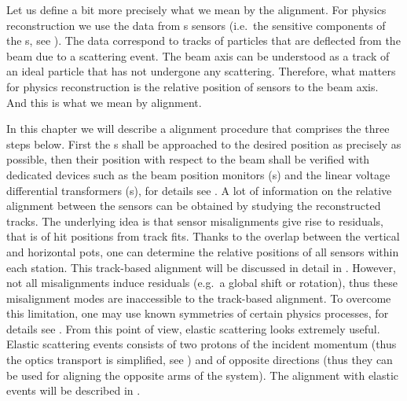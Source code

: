 Let us define a bit more precisely what we mean by the  alignment. For physics reconstruction we use the data from s sensors (i.e.~the sensitive components of the s, see ). The data correspond to tracks of particles that are deflected from the beam due to a scattering event. The beam axis can be understood as a track of an ideal particle that has not undergone any scattering. Therefore, what matters for physics reconstruction is the relative position of  sensors to the beam axis. And this is what we mean by  alignment.


In this chapter we will describe a  alignment procedure that comprises the three steps below.
\bitm
\itm First the s shall be approached to the desired position as precisely as possible, then their position with respect to the beam shall be verified  with dedicated devices such as the beam position monitors (s) and the linear voltage differential transformers (s), for details see .
\itm A lot of information on the relative alignment between the  sensors can be obtained by studying the reconstructed tracks. The underlying idea is that sensor misalignments give rise to residuals, that is  of hit positions from track fits. Thanks to the overlap between the vertical and horizontal pots, one can determine the relative positions of all  sensors within each station. This track-based alignment will be discussed in detail in .
\itm However, not all misalignments induce residuals (e.g.~a global shift or rotation), thus these misalignment modes are inaccessible to the track-based alignment. To overcome this limitation, one may use known symmetries of certain physics processes, for details see . From this point of view, elastic scattering looks extremely useful. Elastic scattering events consists of two protons of the incident momentum (thus the optics transport is simplified, see ) and of opposite directions (thus they can be used for aligning the opposite arms of the  system). The alignment with elastic events will be described in .
\eitm

